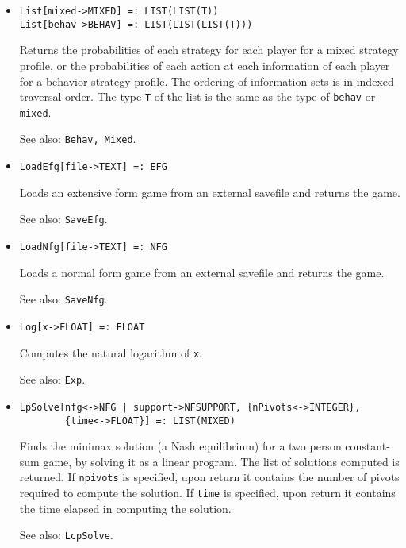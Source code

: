 \begin{itemize}
\item
\protect \large \begin{verbatim}
List[mixed->MIXED] =: LIST(LIST(T))
List[behav->BEHAV] =: LIST(LIST(LIST(T)))
\end{verbatim}\normalsize

\bd 
Returns the probabilities of each strategy for each player for a
mixed strategy profile, or the probabilities of each action at each
information of each player for a behavior strategy profile.  The
ordering of information sets is in indexed traversal order.  The type
\verb+T+ of the list is the same as the type of \verb+behav+ or
\verb+mixed+.
\item
[See also:] {\tt Behav, Mixed}.
\ed

\item
\protect \large \begin{verbatim}
LoadEfg[file->TEXT] =: EFG
\end{verbatim}\normalsize

\bd
Loads an extensive form game from an external savefile
and returns the game.
\item
[See also:] {\tt SaveEfg}.
\ed

\item
\protect \large \begin{verbatim}
LoadNfg[file->TEXT] =: NFG
\end{verbatim}\normalsize

\bd
Loads a normal form game from an external savefile
and returns the game.  
\item
[See also:] {\tt SaveNfg}.
\ed

\item
\protect \large \begin{verbatim}
Log[x->FLOAT] =: FLOAT
\end{verbatim} \normalsize

\bd
Computes the natural logarithm of \verb+x+.
\item
[See also:] {\tt Exp}.
\ed

\item
\protect \large \begin{verbatim}
LpSolve[nfg<->NFG | support->NFSUPPORT, {nPivots<->INTEGER},
        {time<->FLOAT}] =: LIST(MIXED)
\end{verbatim}\normalsize

\bd
Finds the minimax solution (a Nash equilibrium) for a
two person constant-sum game, by solving it as a linear program.
The list of solutions computed is returned.  If \verb+npivots+ is
specified, upon return it contains the number of pivots required to
compute the solution.  If \verb+time+ is specified, upon return it
contains the time elapsed in computing the solution.
\item
[See also:] {\tt LcpSolve}.
\ed


\end{itemize}
